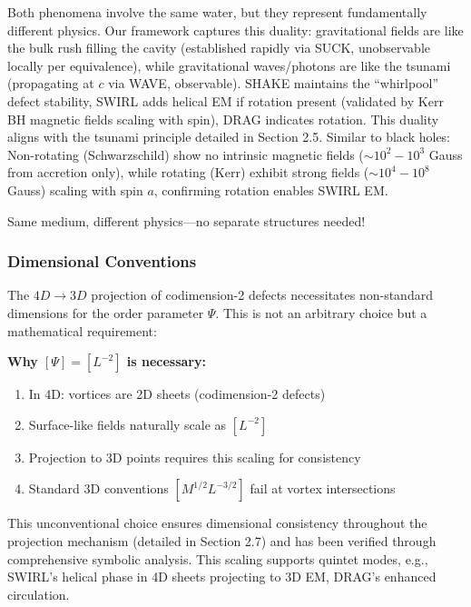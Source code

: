Both phenomena involve the same water, but they represent fundamentally different physics. Our framework captures this duality: gravitational fields are like the bulk rush filling the cavity (established rapidly via SUCK, unobservable locally per equivalence), while gravitational waves/photons are like the tsunami (propagating at $c$ via WAVE, observable). SHAKE maintains the ``whirlpool'' defect stability, SWIRL adds helical EM if rotation present (validated by Kerr BH magnetic fields scaling with spin), DRAG indicates rotation. This duality aligns with the tsunami principle detailed in Section 2.5. Similar to black holes: Non-rotating (Schwarzschild) show no intrinsic magnetic fields ($\sim 10^2 - 10^3$ Gauss from accretion only), while rotating (Kerr) exhibit strong fields ($\sim 10^4 - 10^8$ Gauss) scaling with spin $a$, confirming rotation enables SWIRL EM.

Same medium, different physics---no separate structures needed!


\subsubsection{Dimensional Conventions}

The $4D\to3D$ projection of codimension-2 defects necessitates non-standard dimensions for the order parameter $\Psi$. This is not an arbitrary choice but a mathematical requirement:

\textbf{Why $[\Psi] = [L^{-2}]$ is necessary:}
\begin{enumerate}
\item In 4D: vortices are 2D sheets (codimension-2 defects)
\item Surface-like fields naturally scale as $[L^{-2}]$
\item Projection to 3D points requires this scaling for consistency
\item Standard 3D conventions $[M^{1/2} L^{-3/2}]$ fail at vortex intersections
\end{enumerate}

This unconventional choice ensures dimensional consistency throughout the projection mechanism (detailed in Section 2.7) and has been verified through comprehensive symbolic analysis. This scaling supports quintet modes, e.g., SWIRL's helical phase in 4D sheets projecting to 3D EM, DRAG's enhanced circulation.

